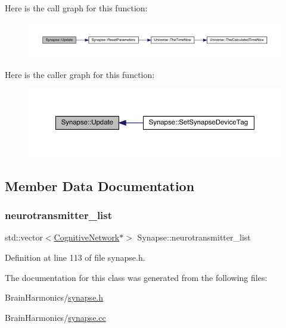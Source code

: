 Here is the call graph for this function\+:
\nopagebreak
\begin{figure}[H]
\begin{center}
\leavevmode
\includegraphics[width=350pt]{class_synapse_a37c64f579846cf18d09b3b262d566ffe_cgraph}
\end{center}
\end{figure}
Here is the caller graph for this function\+:
\nopagebreak
\begin{figure}[H]
\begin{center}
\leavevmode
\includegraphics[width=350pt]{class_synapse_a37c64f579846cf18d09b3b262d566ffe_icgraph}
\end{center}
\end{figure}


\subsection{Member Data Documentation}
\mbox{\label{class_synapse_ae1ab127b1a94b459f20aa5a5e9a23630}} 
\subsubsection{\texorpdfstring{neurotransmitter\+\_\+list}{neurotransmitter\_list}}
{\footnotesize\ttfamily std\+::vector$<$\hyperlink{class_cognitive_network}{Cognitive\+Network}$\ast$$>$ Synapse\+::neurotransmitter\+\_\+list\hspace{0.3cm}{\ttfamily [protected]}}



Definition at line 113 of file synapse.\+h.



The documentation for this class was generated from the following files\+:\begin{DoxyCompactItemize}
\item 
Brain\+Harmonics/\hyperlink{synapse_8h}{synapse.\+h}\item 
Brain\+Harmonics/\hyperlink{synapse_8cc}{synapse.\+cc}\end{DoxyCompactItemize}
